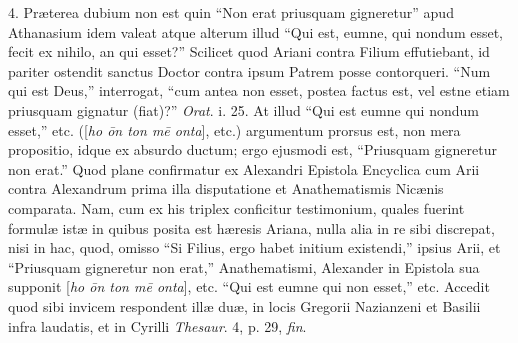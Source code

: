 4. Præterea
dubium non est quin ``Non erat priusquam gigneretur'' apud
Athanasium idem valeat atque alterum illud ``Qui est, eumne, qui
nondum esset, fecit ex nihilo, an qui esset?'' Scilicet quod Ariani
contra Filium effutiebant, id pariter ostendit sanctus Doctor contra
ipsum Patrem posse contorqueri. ``Num qui est Deus,'' interrogat, ``cum antea non esset, postea factus est, vel estne etiam priusquam
gignatur (fiat)?'' \emph{Orat}. i. 25. At illud ``Qui est eumne qui
nondum esset,'' etc. ([\emph{ho \={o}n ton m\={e} onta}], etc.)
argumentum prorsus est, non mera propositio, idque ex absurdo ductum;
ergo ejusmodi est, ``Priusquam gigneretur non erat.'' Quod plane
confirmatur ex Alexandri Epistola Encyclica cum Arii contra Alexandrum
prima illa disputatione et Anathematismis Nicænis comparata. Nam, cum
ex his triplex conficitur testimonium, quales fuerint formulæ istæ
in quibus posita est hæresis Ariana, nulla alia in re sibi discrepat,
nisi in hac, quod, omisso ``Si Filius, ergo habet initium existendi,''
ipsius Arii, et ``Priusquam gigneretur non erat,'' Anathematismi, Alexander in Epistola sua supponit [\emph{ho \={o}n ton
m\={e} onta}], etc. ``Qui est eumne qui non esset,'' etc.
Accedit quod sibi invicem respondent illæ duæ, in locis Gregorii
Nazianzeni et Basilii infra laudatis, et in Cyrilli \emph{Thesaur}. 4,
p. 29, \emph{fin}.

